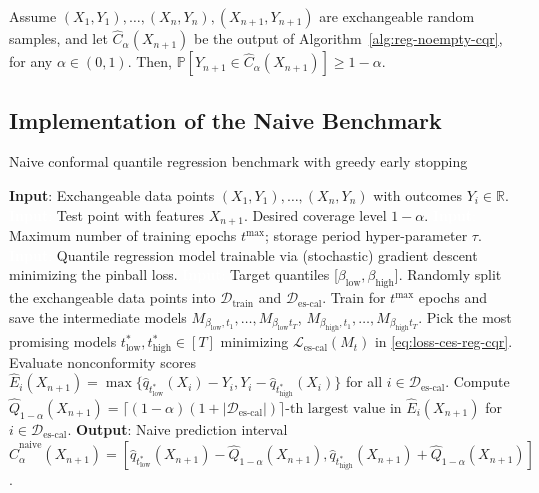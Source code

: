 \begin{corollary}\label{thm:reg-noempty-cqr}
Assume $(X_{1},Y_{1}), \ldots, (X_{n},Y_{n}), (X_{n+1},Y_{n+1})$ are exchangeable random samples, and let $\hat{C}_{\alpha}(X_{n+1})$ be the output of Algorithm~\ref{alg:reg-noempty-cqr}, for any $\alpha \in (0,1)$. 
Then, $\mathbb{P}[Y_{n+1} \in \hat{C}_{\alpha}(X_{n+1})] \geq 1-\alpha$.
\end{corollary}


\subsection{Implementation of the Naive Benchmark}  \label{app:naive-benchmarks-details-cqr}

\begin{algorithm}[H]
    \caption{Naive conformal quantile regression benchmark with greedy early stopping}
    \label{alg:naive-reg-cqr}
    \begin{algorithmic}[1]
        \STATE \textbf{Input}: Exchangeable data points $(X_{1},Y_{1}), \ldots, (X_{n},Y_{n})$ with outcomes $Y_i \in \mathbb{R}$.
        \STATE \textcolor{white}{\textbf{Input}:} Test point with features $X_{n+1}$. Desired coverage level $1-\alpha$.
        \STATE \textcolor{white}{\textbf{Input}:} Maximum number of training epochs $t^{\text{max}}$; storage period hyper-parameter $\tau$.
        \STATE \textcolor{white}{\textbf{Input}:} Quantile regression model trainable via (stochastic) gradient descent minimizing the pinball loss. 
        \STATE \textcolor{white}{\textbf{Input}:} Target quantiles [$\beta_{\text{low}}, \beta_{\text{high}}$]. 
        \STATE Randomly split the exchangeable data points into $\mathcal{D}_{\text{train}}$ and $\mathcal{D}_{\text{es-cal}}$.
        \STATE Train for $t^{\text{max}}$ epochs and save the intermediate models $M_{\beta_{\text{low}},t_1} , \dots, M_{\beta_{\text{low}}t_T}$,  $M_{\beta_{\text{high}},t_1} , \dots, M_{\beta_{\text{high}}t_T}$.
        \STATE Pick the most promising models $t^*_{\text{low}}, t^*_{\text{high}}\in [T]$ minimizing $\mathcal{L}_{\text{es-cal}}(M_t)$ in \eqref{eq:loss-ces-reg-cqr}.
        \STATE Evaluate nonconformity scores $\hat{E}_i(X_{n+1}) = \max\{\hat{q}_{t^*_{\text{low}}}(X_i) - Y_i, Y_i -\hat{q}_{t^*_{\text{high}}}(X_i)\}$ for all $i \in \mathcal{D}_{\text{es-cal}}$.
        \STATE Compute $\hat{Q}_{1-\alpha}(X_{n+1}) = \lceil (1-\alpha)(1+|\mathcal{D}_{\text{es-cal}}|) \rceil\text{-th largest value in }
        \hat{E}_i(X_{n+1})$ for $i \in \mathcal{D}_{\text{es-cal}}$.
        \STATE \textbf{Output}: Naive prediction interval $\hat{C}^{\text{naive}}_{\alpha}(X_{n+1}) = [\hat{q}_{t^*_{\text{low}}}(X_{n+1}) - \hat{Q}_{1-\alpha}(X_{n+1}), \hat{q}_{t^*_{\text{high}}}(X_{n+1}) + \hat{Q}_{1-\alpha}(X_{n+1})]$.
    \end{algorithmic}
\end{algorithm}

